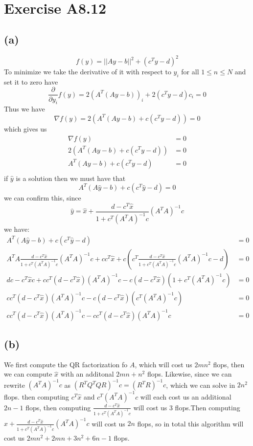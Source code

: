 \section*{Exercise A8.12}
\subsection*{(a)}
$$f(y)=||Ay-b||^2+(c^Ty-d)^2$$
To minimize we take the derivative of it with respect to $y_i$ for all
$1\leq n \leq N$ and set it to zero have
$$\frac{\partial}{\partial y_i} f(y)=2(A^T(Ay-b))_i+2(c^Ty-d)c_i=0$$
Thus we have 
$$\nabla f(y)=2(A^T(Ay-b)+c(c^Ty-d))=0$$
which gives us
\begin{align*}
    \nabla f(y)&=0\\
    2(A^T(Ay-b)+c(c^Ty-d))&=0\\
    A^T(Ay-b)+c(c^Ty-d)&=0\\
\end{align*}
if $\hat{y}$ is a solution then we must have that
$$A^T(A\hat{y}-b)+c(c^T\hat{y}-d)=0$$
we can confirm this, since 
$$\hat{y}=\hat{x}+\frac{d-c^T\hat{x}}{1+c^T(A^TA)^{-1}c}(A^TA)^{-1}c$$
we have:
\begin{align*}
    A^T(A\hat{y}-b)+c(c^T\hat{y}-d)&=0\\
    A^TA\frac{d-c^T\hat{x}}{1+c^T(A^TA)^{-1}c}(A^TA)^{-1}c+cc^T\hat{x}+c(c^T\frac{d-c^T\hat{x}}{1+c^T(A^TA)^{-1}c}(A^TA)^{-1}c-d)&=0\\
    dc-c^T\hat{x}c+cc^T(d-c^T\hat{x})(A^TA)^{-1}c-c(d-c^T\hat{x})(1+c^T(A^TA)^{-1}c)&=0\\
    cc^T(d-c^T\hat{x})(A^TA)^{-1}c-c(d-c^T\hat{x})(c^T(A^TA)^{-1}c)&=0\\
    cc^T(d-c^T\hat{x})(A^TA)^{-1}c-cc^T(d-c^T\hat{x})(A^TA)^{-1}c&=0
\end{align*}
\subsection*{(b)}
We first compute the QR factorization fo $A$, which will cost us $2mn^2$ flops, 
then we can compute 
$\hat{x}$ with an additonal $2mn+n^2$ flops. Likewise,
since we can rewrite $(A^TA)^{-1}c$ as $(R^TQ^TQR)^{-1}c=(R^TR)^{-1}c$, which 
we can solve in $2n^2$ flops. then computing $c^T\hat{x}$ and $c^T(A^TA)^{-1}c$ will
each cost us an additional $2n-1$ flops, then computing $\frac{d-c^T\hat{x}}{1+c^T(A^TA)^{-1}c}$ will 
cost us 3 flops.Then computing $\hat{x}+\frac{d-c^T\hat{x}}{1+c^T(A^TA)^{-1}c}(A^TA)^{-1}c$
will cost us $2n$ flops, so in total this algorithm will cost us 
$\boxed{2mn^2+2mn+3n^2+6n-1}$ flops.





